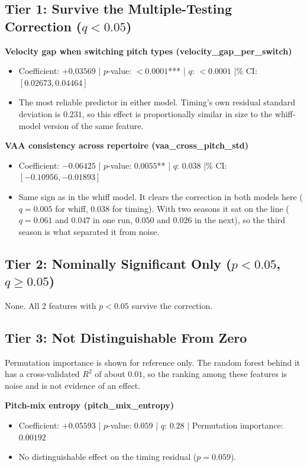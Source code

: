 \documentclass[11pt]{article}
\newcommand{\feat}[1]{\textbf{#1}}
\begin{document}
\subsection*{Tier 1: Survive the Multiple-Testing Correction ($q<0.05$)}

\feat{Velocity gap when switching pitch types (velocity\_gap\_per\_switch)}
\begin{itemize}
\item Coefficient: $+0.03569$ \;|\; $p$-value: $<0.0001$*** \;|\; $q$: $<0.0001$ \;|\% CI: $[0.02673, 0.04464]$
\item The most reliable predictor in either model. Timing's own residual standard deviation is $0.231$, so this effect is proportionally similar in size to the whiff-model version of the same feature.
\end{itemize}

\feat{VAA consistency across repertoire (vaa\_cross\_pitch\_std)}
\begin{itemize}
\item Coefficient: $-0.06425$ \;|\; $p$-value: $0.0055$** \;|\; $q$: $0.038$ \;|\% CI: $[-0.10956, -0.01893]$
\item Same sign as in the whiff model. It clears the correction in both models here ($q=0.005$ for whiff, $0.038$ for timing). With two seasons it sat on the line ($q=0.061$ and $0.047$ in one run, $0.050$ and $0.026$ in the next), so the third season is what separated it from noise.
\end{itemize}

\subsection*{Tier 2: Nominally Significant Only ($p<0.05$, $q\ge0.05$)}

None. All 2 features with $p<0.05$ survive the correction.

\subsection*{Tier 3: Not Distinguishable From Zero}

Permutation importance is shown for reference only. The random forest behind it has a cross-validated $R^2$ of about $0.01$, so the ranking among these features is noise and is not evidence of an effect.

\feat{Pitch-mix entropy (pitch\_mix\_entropy)}
\begin{itemize}
\item Coefficient: $+0.05593$ \;|\; $p$-value: $0.059$ \;|\; $q$: $0.28$ \;|\; Permutation importance: $0.00192$
\item No distinguishable effect on the timing residual ($p=0.059$).
\end{itemize}
\end{document}
